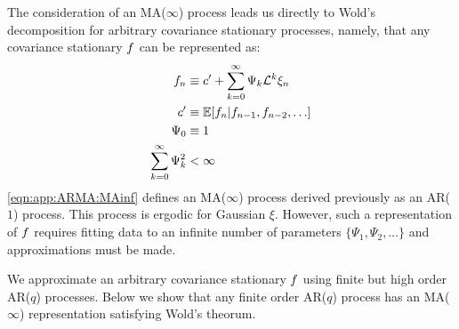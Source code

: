 The consideration of an MA($\infty$) process leads us directly to Wold's decomposition for arbitrary covariance stationary processes, namely, that any covariance stationary $f$ can be represented as:
\begin{align}
f_n & \equiv  c' + \sum_{k=0}^{\infty} \Psi_k \mathcal{L}^k \xi_{n}  \label{eqn:app:ARMA:MAinf} \\
c' & \equiv \mathbb{E}[f_n | f_{n-1}, f_{n-2}, \hdots] \\
\Psi_0 & \equiv 1 \\
\sum_{k=0}^{\infty} \Psi_k^2 & < \infty
\end{align}
\cref{eqn:app:ARMA:MAinf} defines an MA($\infty$) process derived previously as an AR($1$) process. This process is ergodic for Gaussian $\xi$. However, such a representation of $f$ requires fitting data to an infinite number of parameters $\{\Psi_1, \Psi_2, \hdots \}$  and approximations must be made. 


We approximate an arbitrary covariance stationary $f$ using finite but high order AR($q$) processes. Below we show that any finite order AR($q$) process has an MA($\infty$) representation satisfying Wold's theorum.


